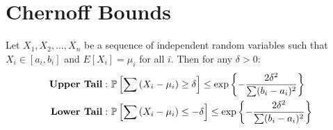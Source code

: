 \appendices
\section{Chernoff Bounds}

\begin{lemma}
\label{Lem:Chernoff}
Let $X_1, X_2,\ldots, X_n$ be a sequence of independent random variables such that $X_i \in[a_i, b_i]$ and $E[X_i]=\mu_i$ for all $i$. Then for any $\delta>0$:
\begin{align*}
\text{\textbf{Upper Tail}}: ~&\mathbb{P}\left[\sum \left(X_i-\mu_i\right)\geq \delta\right]\leq \exp\left\lbrace-\frac{2\delta^2}{\sum(b_i-a_i)^2}\right\rbrace\\
\textbf{Lower Tail}: ~&\mathbb{P}\left[\sum \left(X_i-\mu_i\right)\leq -\delta\right]\leq \exp\left\lbrace-\frac{2\delta^2}{\sum(b_i-a_i)^2}\right\rbrace
\end{align*}
\end{lemma}


